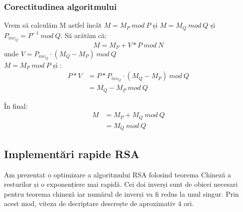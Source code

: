 \documentclass[12pt, oneside]{book}
\begin{document}
	  \subsubsection{Corectitudinea algoritmului}
	  Vrem să calculăm M astfel încât $M =M_P \ mod \ P$ și $M=M_Q \ mod \ Q$ și $P_{inv_Q}=P^{-1} \ mod \ Q$. Să arătăm că: \\
	  $$ M=M_P + V*P \ mod \ N$$
	  unde $ V=P_{inv_Q} \cdot   (M_Q-M_P) \ mod \ Q$ \\
	  $M = M_P \ mod \ P$ și : \\
	  \begin{align*}
	  P*V&= P* P_{inv_Q} \cdot   (M_Q - M_P) \ mod \ Q \\
	   &= M_Q - M_P \ mod \ Q
	  \end{align*}
	  
	  În final: \\
	  \begin{align*}
	   M&= M_P + M_Q \ mod \ Q \\
	   &= M_Q \ mod \ Q 
	  \end{align*}
	  
	  
	  \subsection{Implementări rapide RSA}
	  Am prezentat o optimizare a algoritmului RSA folosind teorema Chineză a resturilor și o exponențiere mai rapidă. Cei doi inverși sunt de obicei necesari pentru teorema chineză iar numărul de inverși va fi redus la unul singur. Prin acest mod, viteza de decriptare descrește de aproximativ $4$ ori.
\end{document}
